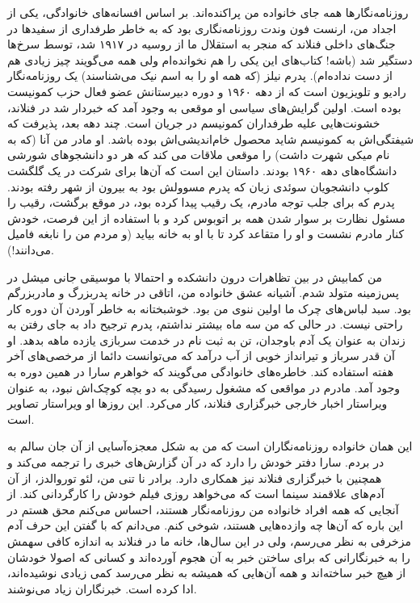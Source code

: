 روزنامه‌نگارها همه جای خانواده من پراکنده‌اند. بر اساس افسانه‌های
خانوادگی، یکی از اجداد من، ارنست فون وندت
روزنامه‌نگاری بود که به خاطر طرفداری از سفیدها در جنگ‌های داخلی فنلاند
که منجر به استقلال ما از روسیه در ۱۹۱۷ شد، توسط سرخ‌ها دستگیر شد (باشه!
کتاب‌های این یکی را هم نخوانده‌ام ولی همه می‌گویند چیز زیادی هم از دست
نداده‌ام). پدرم نیلز (که همه او را به اسم
نیک می‌شناسند) یک روزنامه‌نگار رادیو و تلویزیون است که
از دهه ۱۹۶۰ و دوره دبیرستانش عضو فعال حزب کمونیست بوده است. اولین
گرایش‌های سیاسی او موقعی به وجود آمد که خبردار شد در فنلاند، خشونت‌هایی
علیه طرفداران کمونیسم در جریان است. چند دهه بعد، پذیرفت که شیفتگی‌اش به
کمونیسم شاید محصول خام‌اندیشی‌اش بوده باشد. او مادر من
آنا (که به نام میکی شهرت داشت) را
موقعی ملاقات می کند که هر دو دانشجوهای شورشی دانشگاه‌های دهه ۱۹۶۰
بودند. داستان این است که آن‌ها برای شرکت در یک گلگشت کلوپ دانشجویان
سوئدی زبان که پدرم مسوولش بود به بیرون از شهر رفته بودند. پدرم که برای
جلب توجه مادرم، یک رقیب پیدا کرده بود، در موقع برگشت، رقیب را مسئول
نظارت بر سوار شدن همه بر اتوبوس کرد و با استفاده از این فرصت، خودش
کنار مادرم نشست و او را متقاعد کرد تا با او به خانه بیاید (و مردم من
را نابغه فامیل می‌دانند!).

من کمابیش در بین تظاهرات درون دانشکده و احتمالا با موسیقی جانی
میشل در پس‌زمینه متولد شدم. آشیانه عشق خانواده
من، اتاقی در خانه پدربزرگ و مادربزرگم بود. سبد لباس‌های چرک ما اولین
ننوی من بود. خوشبختانه به خاطر آوردن آن دوره کار راحتی نیست. در حالی
که من سه ماه بیشتر نداشتم،‌ پدرم ترجیح داد به جای رفتن به زندان به
عنوان یک آدم باوجدان، تن به ثبت نام در خدمت سربازی یازده ماهه بدهد. او
آن قدر سرباز و تیرانداز خوبی از آب درآمد که می‌توانست دائما از مرخصی‌های
آخر هفته استفاده کند. خاطره‌های خانوادگی می‌گویند که خواهرم سارا در همین
دوره به وجود آمد. مادرم در مواقعی که مشغول رسیدگی به دو بچه کوچک‌اش
نبود، به عنوان ویراستار اخبار خارجی خبرگزاری فنلاند، کار می‌کرد. این
روزها او ویراستار تصاویر است.

این همان خانواده روزنامه‌نگاران است که من به شکل معجزه‌آسایی از آن جان
سالم به در بردم. سارا دفتر خودش را دارد که در آن گزارش‌های خبری را
ترجمه می‌کند و همچنین با خبرگزاری فنلاند نیز همکاری دارد. برادر نا تنی
من، لئو توروالدز، از آن آدم‌های علاقمند سینما است که می‌خواهد روزی فیلم
خودش را کارگردانی کند. از آنجایی که همه افراد خانواده من روزنامه‌نگار
هستند، احساس می‌کنم محق هستم در این باره که آن‌ها چه وازده‌هایی هستند،
شوخی کنم. می‌دانم که با گفتن این حرف آدم مزخرفی به نظر می‌رسم، ولی در
این سال‌ها، خانه ما در فنلاند به اندازه کافی سهمش را به خبرنگارانی که
برای ساختن خبر به آن هجوم آورده‌اند و کسانی که اصولا خودشان از هیچ خبر
ساخته‌اند و همه آن‌هایی که همیشه به نظر می‌رسد کمی زیادی نوشیده‌اند، ادا
کرده است. خبرنگاران زیاد می‌نوشند.

